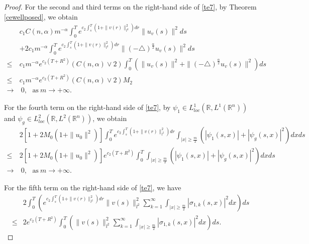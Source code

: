 \documentclass[11pt]{article}
\numberwithin{equation}{section}
\theoremstyle{plain}
\def\geq{\geqslant}
\def\leq{\leqslant}
\begin{document}
\begin{proof}
 For the second and third terms on the right-hand side of \eqref{te7},
 by Theorem \ref{cewellposed}, we obtain
\begin{align} \label{te9}
      & c_1 C(n,\alpha) m^{-\alpha} \int_0^T e^{ c_2 \int_s^T \left( 1 + \| v(r) \|_{l^2}^2 \right) dr } \| u_v(s) \|^2 ds
          \nonumber \\
      & + 2 c_1 m^{-\alpha} \int_0^T e^{ c_2 \int_s^T \left( 1 + \| v(r) \|_{l^2}^2 \right) dr } \| (-\triangle)^{\frac{\alpha}{2}} u_v(s) \|^2 ds
            \nonumber \\
 \leq & c_1 m^{-\alpha}  e^{c_2 (T+ R^2)} \left( C(n,\alpha) \vee 2 \right)
            \int_0^T \left( \| u_v(s) \|^2 + \| (-\triangle)^{\frac{\alpha}{2}} u_v(s) \|^2 \right) ds
            \nonumber \\
 \leq & c_1 m^{-\alpha}  e^{c_2 (T+ R^2)} \left( C(n,\alpha) \vee 2  \right) M_2
            \nonumber \\
 \rightarrow & \ 0,  \ \ \   \text{as} \ m \to +\infty.
\end{align}

 For the fourth term on the right-hand side of \eqref{te7},
 by $\psi_1 \in L_{loc}^1(\mathbb{R}, L^1(\mathbb{R}^n))$
 and $\psi_g \in L_{loc}^2(\mathbb{R}, L^2(\mathbb{R}^n))$, we obtain
\begin{align} \label{te10}
       & 2 \left[ 1 + 2M_0( 1 + \| u_0 \|^2) \right]
               \int_0^T e^{ c_2 \int_s^T \left( 1 + \| v(r) \|_{l^2}^2 \right) dr }
                       \int_{|x| \geq \frac{m}{2}}
                                \left( |\psi_1(s,x)| + |\psi_g(s,x)|^2 \right)
                       dx
               ds
             \nonumber \\
  \leq &  2 \left[ 1 + 2M_0( 1 + \| u_0 \|^2) \right]
           e^{ c_2 \left( T + R^2 \right) }
               \int_0^T
                        \int_{|x| \geq \frac{m}{2}}
                                \left( |\psi_1(s,x)| + |\psi_g(s,x)|^2 \right)
                        dx
                ds
          \nonumber \\
 \rightarrow & \ 0,  \ \ \   \text{as} \ m \to +\infty.
\end{align}


 For the fifth term on the right-hand side of \eqref{te7}, we have
\begin{align} \label{te11}
      & 2 \int_0^T
      \left (
      e^{ c_2 \int_s^T \left( 1 + \| v(r) \|_{l^2}^2 \right) dr }
                     \| v(s) \|_{l^2}^2
                       \sum_{k=1}^{\infty}
                         \int_{|x| \geq \frac{m}{2}} |\sigma_{1,k} (s,x)|^2 dx
                         \right )
          ds
          \nonumber \\
 \leq & 2 e^{ c_2 \left( T + R^2 \right) }
             \int_0^T
             \left (  \| v(s) \|_{l^2}^2
                       \sum_{k=1}^{\infty}
                          \int_{|x| \geq \frac{m}{2}} |\sigma_{1,k} (s,x)|^2 dx
                          \right )
             ds.
\end{align}


\end{proof}
\end{document}
